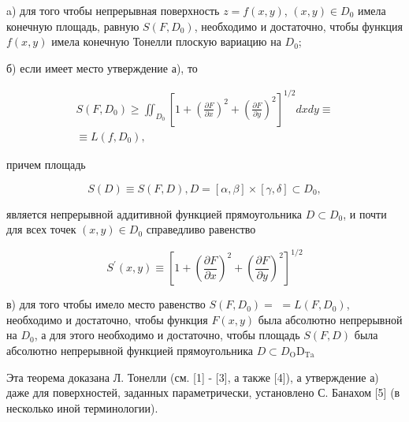 \documentclass[10pt]{article}
\begin{document}
a) для того чтобы непрерывная поверхность $z=f(x, y)$, $(x, y) \in D_{0}$ имела конечную площадь, равную $S\left(F, D_{0}\right)$, необходимо и достаточно, чтобы функция $f(x, y)$ имела конечную Тонелли плоскую вариацию на $D_{0}$;



б) если имеет место утверждение а), то



\[

\begin{gathered}

S\left(F, D_{0}\right) \geqslant \iint_{D_{0}}\left[1+\left(\frac{\partial F}{\partial x}\right)^{2}+\left(\frac{\partial F}{\partial y}\right)^{2}\right]^{1 / 2} d x d y \equiv \\

\equiv L\left(f, D_{0}\right),

\end{gathered}

\]



причем площадь



\[

S(D) \equiv S(F, D), D=[\alpha, \beta] \times[\gamma, \delta] \subset D_{0},

\]



является непрерывной аддитивной функцией прямоугольника $D \subset D_{0}$, и почти для всех точек $(x, y) \in D_{0}$ справедливо равенство



\[

S^{\prime}(x, y) \equiv\left[1+\left(\frac{\partial F}{\partial x}\right)^{2}+\left(\frac{\partial F}{\partial y}\right)^{2}\right]^{1 / 2}

\]



в) для того чтобы имело место равенство $S\left(F, D_{0}\right)=$ $=L\left(F, D_{0}\right)$, необходимо и достаточно, чтобы функция $F(x, y)$ была абсолютно непрерывной на $D_{0}$, а для этого необходимо и достаточно, чтобы площадь $S(F, D)$ была абсолютно непрерывной функцией прямоугольника $D \subset D_{\mathrm{O}} \mathrm{D}_{\mathrm{Ta}}$



Эта теорема доказана Л. Тонелли (см. [1] - [3], а также [4]), а утверждение а) даже для поверхностей, заданных параметрически, установлено С. Банахом [5] (в несколько иной терминологии).
\end{document}
